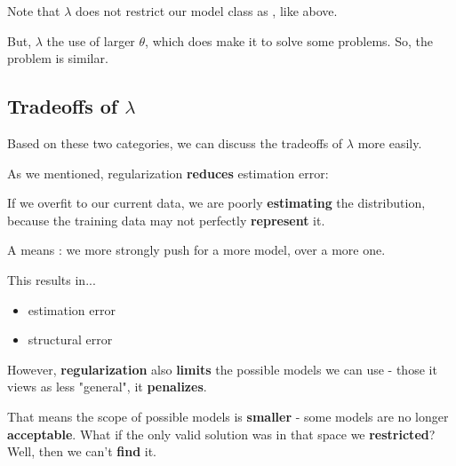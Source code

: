         
        \begin{clarification}
           Note that $\lambda$ does not restrict our model class  as , like above. 
        
            But, $\lambda$  the use of larger $\theta$, which does make it  to solve some problems. So, the  problem is similar.
        \end{clarification}
        
    \subsection{Tradeoffs of $\lambda$}
        
        Based on these two categories, we can discuss the tradeoffs of $\lambda$ more easily.
        
        As we mentioned, regularization \textbf{reduces} estimation error: 
        
        If we overfit to our current data, we are poorly \textbf{estimating} the distribution, because the training data may not perfectly \textbf{represent} it.\\
        
        \begin{concept}
            A  means : we more strongly push for a more  model, over a more  one.
            
            This results in...
            
            \begin{itemize}
                \item {} estimation error
                \item {} structural error
            \end{itemize}
        \end{concept}
        
        However, \textbf{regularization} also \textbf{limits} the possible models we can use - those it views as less "general", it \textbf{penalizes}.
        
        That means the scope of possible models is \textbf{smaller} - some models are no longer \textbf{acceptable}. What if the only valid solution was in that space we \textbf{restricted}? Well, then we can't \textbf{find} it.
        
